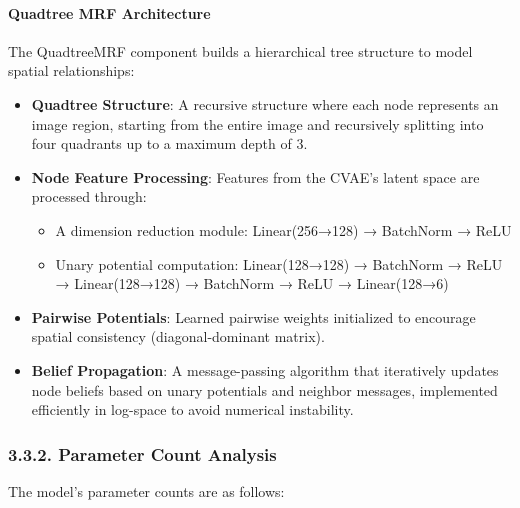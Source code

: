 \documentclass[conference]{IEEEtran}
\begin{document}
\paragraph{Quadtree MRF Architecture}
The QuadtreeMRF component builds a hierarchical tree structure to model spatial relationships:
\begin{itemize}
    \item \textbf{Quadtree Structure}: A recursive structure where each node represents an image region, starting from the entire image and recursively splitting into four quadrants up to a maximum depth of 3.
    \item \textbf{Node Feature Processing}: Features from the CVAE's latent space are processed through:
    \begin{itemize}
        \item A dimension reduction module: Linear(256→128) → BatchNorm → ReLU
        \item Unary potential computation: Linear(128→128) → BatchNorm → ReLU → Linear(128→128) → BatchNorm → ReLU → Linear(128→6)
    \end{itemize}
    \item \textbf{Pairwise Potentials}: Learned pairwise weights initialized to encourage spatial consistency (diagonal-dominant matrix).
    \item \textbf{Belief Propagation}: A message-passing algorithm that iteratively updates node beliefs based on unary potentials and neighbor messages, implemented efficiently in log-space to avoid numerical instability.
\end{itemize}

\subsubsection*{3.3.2. Parameter Count Analysis}

The model's parameter counts are as follows:
\end{document}
